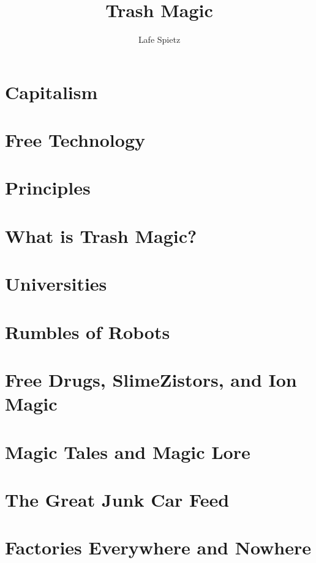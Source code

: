 \documentclass[ebook,12pt,openany]{memoir} %
\title{Trash Magic}
\author{Lafe Spietz}
\begin{document}
\maketitle

\chapter{Capitalism}


\chapter{Free Technology}


\chapter{Principles}


\chapter{What is Trash Magic?}


\chapter{Universities}


\chapter{Rumbles of Robots}


\chapter{Free Drugs, SlimeZistors, and Ion Magic}


\chapter{Magic Tales and Magic Lore}


\chapter{The Great Junk Car Feed}


\chapter{Factories Everywhere and Nowhere}

\end{document}
